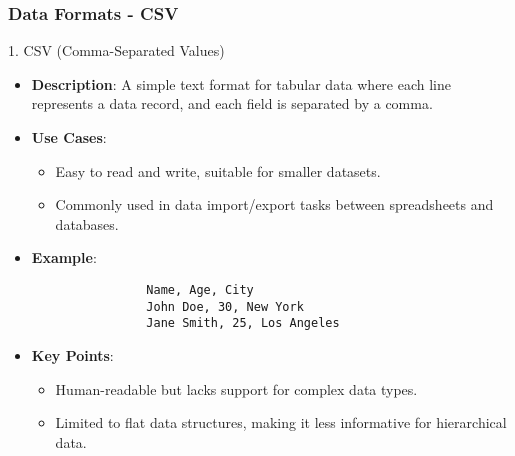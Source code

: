 \documentclass[aspectratio=169]{beamer}
\begin{document}
\begin{frame}[fragile]
    \frametitle{Data Formats - CSV}
    \begin{block}{1. CSV (Comma-Separated Values)}
        \begin{itemize}
            \item \textbf{Description}: A simple text format for tabular data where each line represents a data record, and each field is separated by a comma.
            \item \textbf{Use Cases}:
            \begin{itemize}
                \item Easy to read and write, suitable for smaller datasets.
                \item Commonly used in data import/export tasks between spreadsheets and databases.
            \end{itemize}
            \item \textbf{Example}:
            \begin{lstlisting}
                Name, Age, City
                John Doe, 30, New York
                Jane Smith, 25, Los Angeles
            \end{lstlisting}
            \item \textbf{Key Points}:
            \begin{itemize}
                \item Human-readable but lacks support for complex data types.
                \item Limited to flat data structures, making it less informative for hierarchical data.
            \end{itemize}
        \end{itemize}
    \end{block}
\end{frame}
\end{document}
